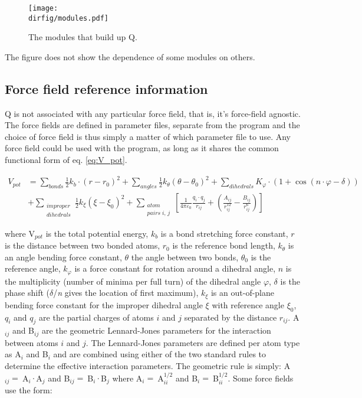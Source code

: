 \documentclass[a4paper,10pt]{article}
\newcommand{\dirfig}{./pictures}
\begin{document}
\begin{figure}[h]
\centerline{\texttt{[image: \\dirfig/modules.pdf]}}
\caption{The modules that build up Q.} \label{fig:modules}
\end{figure}

The figure does not show the dependence of some modules on others.

\subsection{Force field reference information}
Q is  not associated with  any particular  force field, that  is, it's
force-field agnostic. The force fields are defined in parameter files,
separate from the program and the choice of force field is thus simply
a matter of which parameter file to use. Any force field could be used
with the program,  as long as it shares the  common functional form of
eq.  \ref{eq:V_pot}.

\begin{align}
\label{eq:V_pot}
 V_{pot} & =\sum\limits_{bonds} {\frac{1}{2}k_b \cdot \left( {r-r_0
} \right)^2} +\sum\limits_{angles} {\frac{1}{2}k_\theta \left(
{\theta -\theta_0} \right)^2} +\sum\limits_{dihedrals} {K_\varphi
\cdot \left( {1+\cos \left( {n\cdot \varphi -\delta } \right)}
\right)} \nonumber \\ 
& +\sum\limits_{\substack{improper \\ dihedrals}}
{\frac{1}{2}k_\xi \left( {\xi -\xi _0} \right)^2}
+\sum\limits_{\substack{atom \\ pairs \; i , \, j}}
\left[
{\frac{1}{4 \pi \varepsilon_{0} } \frac{q_i \cdot q_j}
{r_{ij}} + \left( \frac{A_{ij}}{r_{ij}^{12}} -
\frac{B_{ij}}{r_{ij}^{6}} \right)}
\right]
\end{align}

where V$_{pot}$ is the total potential energy, $k_{b}$ is a bond
stretching force constant, $r$ is the distance between two bonded
atoms, $r_{0}$ is the reference bond length, $k_{\theta }$ is an
angle bending force constant, $\theta$  the angle between two
bonds, $\theta _{0}$ is the reference angle, $k_{\varphi }$ is a
force constant for rotation around a dihedral angle, $n$ is the
multiplicity (number of minima per full turn) of the dihedral
angle $\varphi$, $\delta$  is the phase shift ($\delta$/\emph{n}
gives the location of first maximum), $k_{\xi }$ is an
out-of-plane bending force constant for the improper dihedral
angle $\xi$ with reference angle $\xi_{0}$, $q_{i}$ and $q_{j}$
are the partial charges of atoms $i$ and $j$ separated by the
distance $r_{ij}$. A$_{ij}$ and B$_{ij}$ are the geometric
Lennard-Jones parameters for the interaction between atoms $i$ and
$j$. The Lennard-Jones parameters are defined per atom type as
A$_{i}$ and B$_{i}$ and are combined using either of the two
standard rules to determine the effective interaction parameters.
The geometric rule is simply: A$_{ij}= \:$A$_{i}\cdot $A$_{j}$ and
B$_{ij}=\:$B$_{i}\cdot $B$_{j}$ where A$_{i}=\:$A$_{ii}^{1/2}$ and
B$_{i}=\:$B$_{ii}^{1/2}$. Some force fields use the form:
\end{document}
